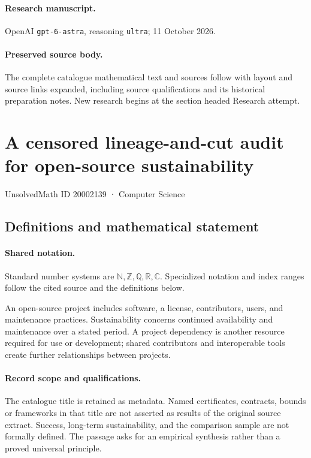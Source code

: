\documentclass[11pt]{article}
\begin{document}
\paragraph{Research manuscript.} OpenAI \texttt{gpt-6-astra}, reasoning \texttt{ultra}; 11 October 2026.
\paragraph{Preserved source body.} The complete catalogue mathematical text and sources follow with layout and source links expanded, including source qualifications and its historical preparation notes. New research begins at the section headed Research attempt.

\section{A censored lineage-and-cut audit for open-source sustainability}\label{20002139}
{\small UnsolvedMath ID 20002139 · Computer Science}
\subsection{Definitions and mathematical statement}

\paragraph{Shared notation.}Standard number systems are $\mathbb N,\mathbb Z,\mathbb Q,\mathbb R,\mathbb C$. Specialized notation and index ranges follow the cited source and the definitions below.


An open-source project includes software, a license, contributors, users, and maintenance practices. Sustainability concerns continued availability and maintenance over a stated period. A project dependency is another resource required for use or development; shared contributors and interoperable tools create further relationships between projects.
\paragraph{Record scope and qualifications.}
The catalogue title is retained as metadata. Named certificates, contracts, bounds or frameworks in that title are not asserted as results of the original source extract.
Success, long-term sustainability, and the comparison sample are not formally defined. The passage asks for an empirical synthesis rather than a proved universal principle.
\end{document}
